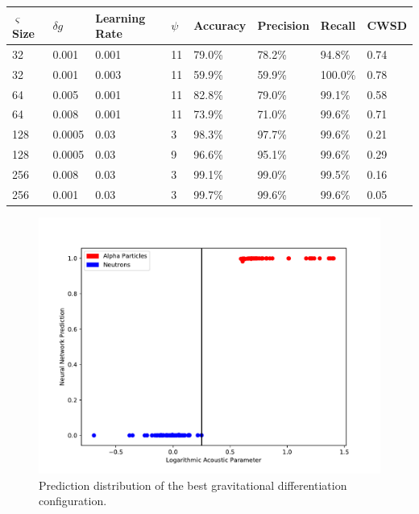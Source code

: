 \documentclass[10pt]{article}
\begin{document}
\begin{minipage}{\textwidth}
    \begin{center}
         \label{grav_overview}
        \begin{tabular}{|l|l|l|l|l|l|l|l|}
            \hline
            $\varsigma$ Size & $\delta g$ & Learning Rate & $\psi$ & Accuracy & Precision & Recall & CWSD \\
            \hline
            32 & 0.001 & 0.001 & 11 & 79.0\% & 78.2\% & 94.8\% & 0.74 \\
            \hline
            32 & 0.001 & 0.003 & 11 & 59.9\% & 59.9\% & 100.0\% & 0.78 \\
            \hline
            64 & 0.005 & 0.001 & 11 & 82.8\% & 79.0\% & 99.1\% & 0.58 \\
            \hline
            64 & 0.008 & 0.001 & 11 & 73.9\% & 71.0\% & 99.6\% & 0.71 \\
            \hline
            128 & 0.0005 & 0.03 & 3 & 98.3\% & 97.7\% & 99.6\% & 0.21 \\
            \hline
            128 & 0.0005 & 0.03 & 9 & 96.6\% & 95.1\% & 99.6\% & 0.29 \\
            \hline
            256 & 0.008 & 0.03 & 3 & 99.1\% & 99.0\% & 99.5\% & 0.16 \\
            \hline
            256 & 0.001 & 0.03 & 3 & 99.7\% & 99.6\% & 99.6\% & 0.05 \\
            \hline
        \end{tabular}
    \end{center}
\end{minipage}

\begin{figure}[H]
    \centering
    \includegraphics[width=\textwidth]{grav_grid_search}
    \caption{\label{grav_grid_search} Prediction distribution of the best gravitational differentiation configuration.}
\end{figure}
\end{document}
